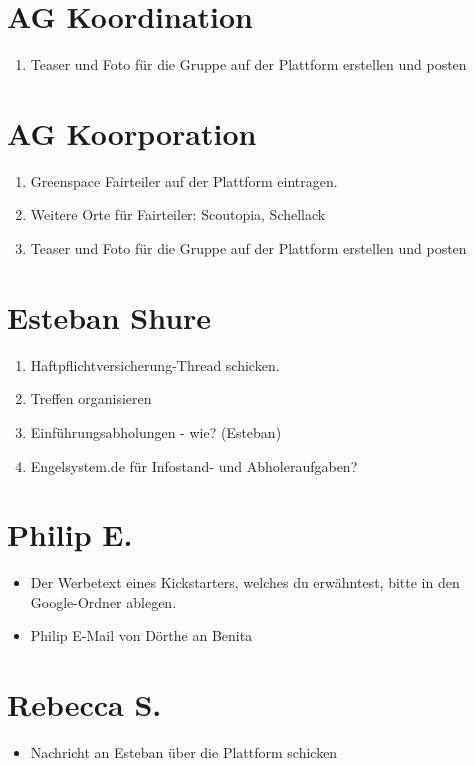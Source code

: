 \documentclass{scrreprt}
\begin{document}
    \section{AG Koordination}
    \begin{enumerate}
       	\item Teaser und Foto für die Gruppe auf der Plattform erstellen und posten
    \end{enumerate}
    \section{AG Koorporation}
    \begin{enumerate}
    	\item Greenspace Fairteiler auf der Plattform eintragen.
    	\item Weitere Orte für Fairteiler: Scoutopia, Schellack
       	\item Teaser und Foto für die Gruppe auf der Plattform erstellen und posten
    \end{enumerate}
    \section{Esteban Shure}
    \begin{enumerate}
    	\item Haftpflichtversicherung-Thread schicken.
    	\item Treffen organisieren
    	\item Einführungsabholungen - wie? (Esteban)
    	\item Engelsystem.de für Infostand- und Abholeraufgaben?
    \end{enumerate}
    \section{Philip E.}
    \begin{itemize}
    	\item Der Werbetext eines Kickstarters, welches du erwähntest, bitte in den Google-Ordner ablegen. 
    	\item Philip E-Mail von Dörthe an Benita
    \end{itemize}
    \section{Rebecca S.}
    \begin{itemize}
    	\item Nachricht an Esteban über die Plattform schicken
    \end{itemize}
 
\end{document}
